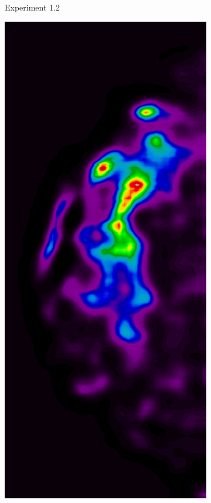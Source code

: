 \begin{figure}[h!]
\begin{subfigure}{0.195\textwidth}
		\caption{Experiment 1.2}
    \end{subfigure}
	\begin{subfigure}{0.195\textwidth}
		\centering
			\includegraphics[width=\textwidth]{plots/examples/example3_probs_1_3.png}

\end{subfigure}
\end{figure}
